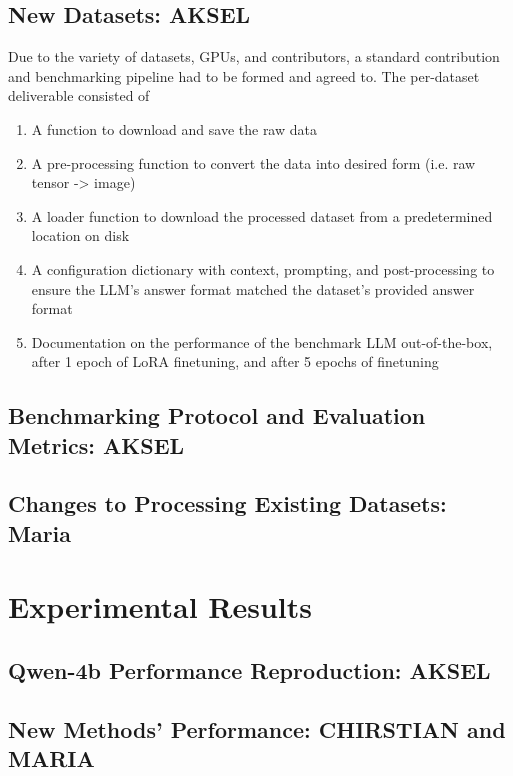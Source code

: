 \documentclass{article}
\begin{document}
\subsection{New Datasets: AKSEL}
Due to the variety of datasets, GPUs, and contributors, a standard contribution and benchmarking pipeline had
to be formed and agreed to. The per-dataset deliverable consisted of

\begin{enumerate}
		\item A function to download and save the raw data
		\item A pre-processing function to convert the data into desired form (i.e. raw tensor -> image)
		\item A loader function to download the processed dataset from a predetermined location on disk
		\item A configuration dictionary with context, prompting, and post-processing to ensure the LLM's answer
				format matched the dataset's provided answer format
		\item Documentation on the performance of the benchmark LLM out-of-the-box, after 1 epoch of LoRA
				finetuning, and after 5 epochs of finetuning
\end{enumerate}

\subsection{Benchmarking Protocol and Evaluation Metrics: AKSEL}

\subsection{Changes to Processing Existing Datasets: Maria}

\section{Experimental Results}

\subsection{Qwen-4b Performance Reproduction: AKSEL}

\subsection{New Methods' Performance: CHIRSTIAN and MARIA}
\end{document}
